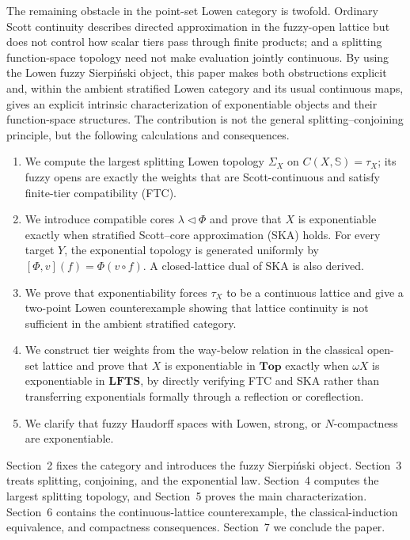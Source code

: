 \documentclass[11pt,a4paper]{article}
\numberwithin{equation}{section}
\theoremstyle{definition}
\theoremstyle{remark}
\newcommand{\Sier}{\mathbb S}
\newcommand{\LFTS}{\mathbf{LFTS}}
\begin{document}
The remaining obstacle in the point-set Lowen category is twofold.
Ordinary Scott continuity describes directed approximation in the
fuzzy-open lattice but does not control how scalar tiers pass through
finite products; and a splitting function-space topology need not make
evaluation jointly continuous.  By using the Lowen fuzzy Sierpiński
object, this paper makes both obstructions explicit and, within the
ambient stratified Lowen category and its usual continuous maps,
gives an explicit intrinsic characterization of exponentiable objects
and their function-space structures.  The contribution is not the
general splitting--conjoining principle, but the following calculations
and consequences.
\begin{enumerate}[label=(\arabic*)]
 \item We compute the largest splitting Lowen topology \(\Sigma_X\) on
 \(C(X,\Sier)=\tau_X\); its fuzzy opens are exactly the weights that are
 Scott-continuous and satisfy finite-tier compatibility (FTC).
 \item We introduce compatible cores \(\lambda\triangleleft\Phi\) and
 prove that \(X\) is exponentiable exactly when stratified Scott--core
 approximation (SKA) holds.  For every target \(Y\), the exponential
 topology is generated uniformly by
 \([\Phi,v](f)=\Phi(v\circ f)\). A closed-lattice dual of
 SKA is also derived.
 \item We prove that exponentiability forces \(\tau_X\) to be a
 continuous lattice and give a two-point Lowen counterexample showing
 that lattice continuity is not sufficient in the ambient stratified
 category.
 \item We construct tier weights from the way-below relation in the
 classical open-set lattice and prove that \(X\) is exponentiable in
 \(\mathbf{Top}\) exactly when \(\omega X\) is exponentiable in
 \(\LFTS\), by directly verifying FTC and SKA rather than transferring
 exponentials formally through a reflection or coreflection.
 \item We clarify that fuzzy Haudorff spaces with Lowen, strong, or
 \(N\)-compactness are exponentiable.
\end{enumerate}

Section~2 fixes the category and introduces the fuzzy Sierpiński
object.  Section~3 treats splitting, conjoining, and the exponential
law.  Section~4 computes the largest splitting topology, and Section~5
proves the main characterization.  Section~6 contains the
continuous-lattice counterexample, the classical-induction
equivalence, and compactness consequences. Section~7 we conclude the paper.
\end{document}
